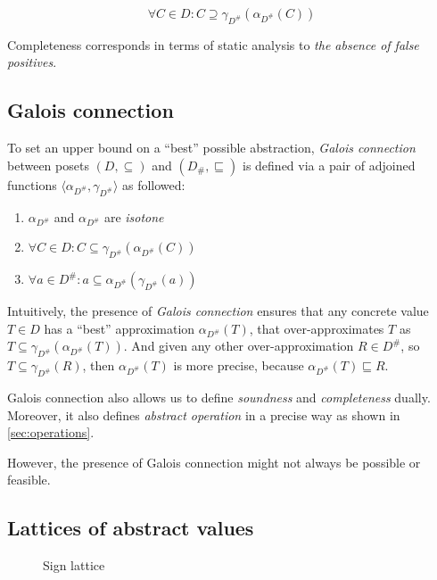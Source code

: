 \documentclass[12pt,oneside]{fithesis2}
\theoremstyle{definition}
\begin{document}
\[
  \forall C \in D: C \supseteq \gamma_{D^\#}(\alpha_{D^\#}(C))
\]

Completeness corresponds in terms of static analysis to \textit{the absence of false positives}.

\subsection{Galois connection}

To set an upper bound on a ``best'' possible abstraction\cite{mine-AIAA10}, \textit{Galois connection}  between posets $(D, \subseteq)$ and $(D_\#, \sqsubseteq)$ is defined via a pair of adjoined functions $\langle \alpha_{D^\#}, \gamma_{D^\#} \rangle$ as followed: \cite{CousotCousot79-1}

\begin{enumerate}
  \item $\alpha_{D^\#}$ and $\alpha_{D^\#}$ are \textit{isotone}
  \item $\forall C \in D: C \subseteq \gamma_{D^\#}(\alpha_{D^\#}(C))$
  \item $\forall a \in D^\#: a \subseteq \alpha_{D^\#}(\gamma_{D^\#}(a))$
\end{enumerate}

Intuitively, the presence of \textit{Galois connection} ensures that any concrete value $T \in D$ has a ``best'' approximation $\alpha_{D^\#}(T)$, that over-approximates $T$ as $T \subseteq \gamma_{D^\#}(\alpha_{D^\#}(T))$. And given any other over-approximation $R \in D^\#$, so $T \subseteq \gamma_{D^\#}(R)$, then $\alpha_{D^\#}(T)$ is more precise, because $\alpha_{D^\#}(T) \sqsubseteq R$.

Galois connection also allows us to define \textit{soundness} and \textit{completeness} dually. Moreover, it also defines \textit{abstract operation} in a precise way as shown in \ref{sec:operations}.

However, the presence of Galois connection might not always be possible or feasible.

\subsection{Lattices of abstract values}

\begin{figure}[ht!]
  \centering
  \caption{Sign lattice}
\end{figure}
\end{document}
